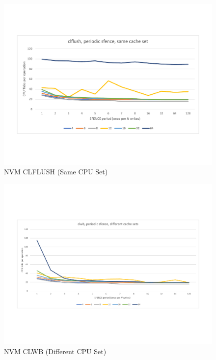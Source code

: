 \begin{figure}
    \centering
    \caption{NVM CLFLUSH (Same CPU Set)}\label{micro:clflush:same}
    \includegraphics[scale=0.35]{micro/nvm-clflush-periodic-same.pdf}
\end{figure}


\begin{figure}
    \centering
    \caption{NVM CLWB (Different CPU Set)}\label{micro:clwb:different}
    \includegraphics[scale=0.35]{micro/nvm-clwb-periodic-different.pdf}
\end{figure}

